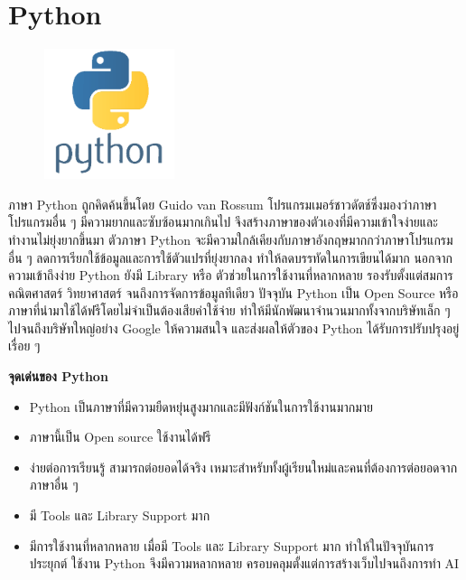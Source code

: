 \section{Python}
\label{Python}
\begin{figure}[!thb]
	\captionsetup{justification=centering}
	\centering
	\includegraphics[width=1.5in]{latex/figures/python.png}
	\label{fig:python}
\end{figure}
ภาษา Python ถูกคิดค้นขึ้นโดย Guido van Rossum โปรแกรมเมอร์ชาวดัตช์ซึ่งมองว่าภาษาโปรแกรมอื่น ๆ  มีความยากและซับซ้อนมากเกินไป จึงสร้างภาษาของตัวเองที่มีความเข้าใจง่ายและทำงานไม่ยุ่งยากขึ้นมา ตัวภาษา Python จะมีความใกล้เคียงกับภาษาอังกฤษมากกว่าภาษา\mbox{โปรแกรม} อื่น ๆ ลดการเรียกใช้ข้อมูลและการใช้ตัวแปรที่ยุ่งยากลง ทำให้ลดบรรทัดในการเขียนได้มาก นอกจากความเข้าถึงง่าย Python ยังมี Library หรือ ตัวช่วยในการใช้งานที่หลากหลาย รองรับตั้งแต่สมการคณิตศาสตร์ วิทยาศาสตร์ จนถึงการจัดการข้อมูลทีเดียว ปัจจุบัน Python เป็น Open Source หรือ ภาษาที่นำมาใช้ได้ฟรีโดยไม่จำเป็นต้องเสียค่าใช้จ่าย ทำให้มีนักพัฒนาจำนวนมากทั้งจากบริษัทเล็ก ๆ  ไปจนถึงบริษัทใหญ่อย่าง Google ให้ความสนใจ และส่งผลให้ตัวของ Python ได้รับการปรับปรุงอยู่เรื่อย ๆ

\begin{flushleft}
	\textbf{จุดเด่นของ Python}
\end{flushleft}
\begin{itemize}
	\item Python เป็นภาษาที่มีความยืดหยุ่นสูงมากและมีฟังก์ชันในการใช้งานมากมาย 
	\item ภาษานี้เป็น Open source ใช้งานได้ฟรี
	\item ง่ายต่อการเรียนรู้ สามารถต่อยอดได้จริง เหมาะสำหรับทั้งผู้เรียนใหม่และคนที่ต้องการต่อยอดจากภาษาอื่น ๆ
	\item มี Tools และ Library Support มาก
	\item มีการใช้งานที่หลากหลาย เมื่อมี Tools และ Library Support มาก ทำให้ในปัจจุบันการ\mbox{ประยุกต์} ใช้งาน Python จึงมีความหลากหลาย ครอบคลุมตั้งแต่การสร้างเว็บไปจนถึงการทำ AI
\end{itemize}
\newpage

